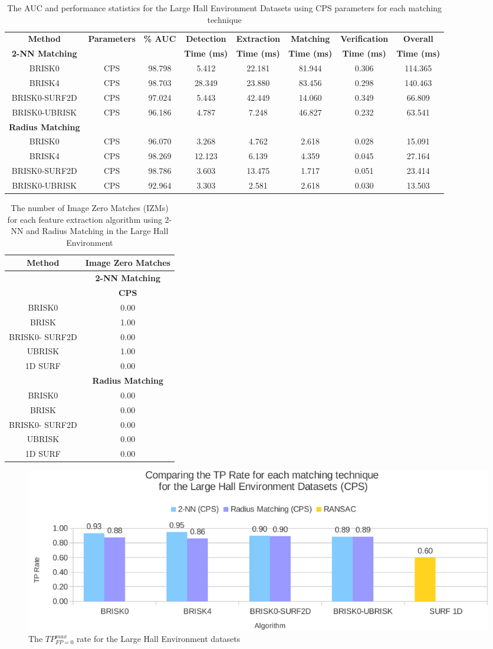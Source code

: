 \begin{table}
\centering
\caption{The AUC and performance statistics for the Large Hall Environment
Datasets using CPS parameters for each matching technique}

\footnotesize
\begin{tabular}{|c|c|c|c|c|c|c|c|}
\hline 
\textbf{Method } & \textbf{Parameters} & \textbf{\% AUC} & \textbf{Detection} & \textbf{Extraction} & \textbf{Matching} & \textbf{Verification} & \textbf{Overall}\tabularnewline
\textbf{2-NN Matching} &  &  & \textbf{Time (ms)} & \textbf{Time (ms)} & \textbf{Time (ms)} & \textbf{Time (ms)} & \textbf{Time (ms)}\tabularnewline
\hline 
\hline 
BRISK0 & CPS & 98.798 & 5.412 & 22.181 & 81.944 & 0.306 & 114.365\tabularnewline
\hline 
BRISK4 & CPS & 98.703 & 28.349 & 23.880 & 83.456 & 0.298 & 140.463\tabularnewline
\hline 
BRISK0-SURF2D & CPS & 97.024 & 5.443 & 42.449 & 14.060 & 0.349 & 66.809\tabularnewline
\hline 
BRISK0-UBRISK & CPS & 96.186 & 4.787 & 7.248 & 46.827 & 0.232 & 63.541\tabularnewline
\hline 
\hline 
\textbf{Radius Matching} &  &  &  &  &  &  & \tabularnewline
\hline 
BRISK0 & CPS & 96.070 & 3.268 & 4.762 & 2.618 & 0.028 & 15.091\tabularnewline
\hline 
BRISK4 & CPS & 98.269 & 12.123 & 6.139 & 4.359 & 0.045 & 27.164\tabularnewline
\hline 
BRISK0-SURF2D & CPS & 98.786 & 3.603 & 13.475 & 1.717 & 0.051 & 23.414\tabularnewline
\hline 
BRISK0-UBRISK & CPS & 92.964 & 3.303 & 2.581 & 2.618 & 0.030 & 13.503\tabularnewline
\hline 
\end{tabular}
\label{app:lh_hamming}
\end{table}



\begin{table}
\centering
\caption{The number of Image Zero Matches (IZMs) for each feature extraction
algorithm using 2-NN and Radius Matching in the Large Hall Environment}


\begin{tabular}{|c|c|}
\hline 
\textbf{Method} & \multicolumn{1}{c|}{\textbf{Image Zero Matches}}\tabularnewline
\hline 
 & \multicolumn{1}{c|}{\textbf{2-NN Matching}}\tabularnewline
\hline 
 & \textbf{CPS}\tabularnewline
\hline 
\hline 
BRISK0 & 0.00\tabularnewline
\hline 
BRISK & 1.00\tabularnewline
\hline 
BRISK0- SURF2D & 0.00\tabularnewline
\hline 
UBRISK & 1.00\tabularnewline
\hline 
1D SURF & 0.00\tabularnewline
\hline 
 & \multicolumn{1}{c|}{\textbf{Radius Matching}}\tabularnewline
\hline 
BRISK0 & 0.00\tabularnewline
\hline 
BRISK & 0.00\tabularnewline
\hline 
BRISK0- SURF2D & 0.00\tabularnewline
\hline 
UBRISK & 0.00\tabularnewline
\hline 
1D SURF & 0.00\tabularnewline
\hline 
\end{tabular}
\label{app:lh_izm}
\end{table}


\begin{figure}
  \centering
    \includegraphics[width=1.0\textwidth]{../Drawings/Graphs/tp_rate_lh_cps.pdf}
    \caption{The $TP_{FP=0}^{max}$ rate for the Large Hall Environment datasets} 
    \label{app:tp_rate_lh}
\end{figure}
